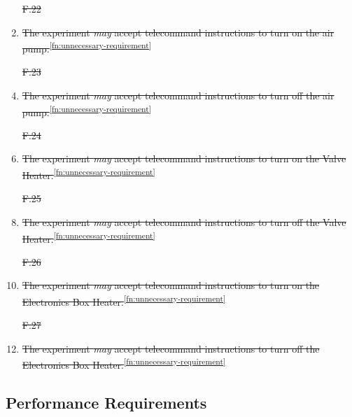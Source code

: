 \documentclass[a4paper,12pt,twoside, final]{article}
\providecommand{\DIFdeltex}[1]{{\protect\color{red}\sout{#1}}}                      %
\providecommand{\DIFaddbegin}{} %
\providecommand{\DIFaddend}{} %
\providecommand{\DIFdelbegin}{} %
\providecommand{\DIFdelend}{} %
\providecommand{\DIFdel}[1]{\texorpdfstring{\DIFdeltex{#1}}{}} %
\newcommand{\DIFscaledelfig}{0.5}
\newlength{\DIFdelgraphicswidth} %
\newlength{\DIFdelgraphicsheight} %
\newcommand{\DIFaddincludegraphics}[2][]{{\color{blue}\fbox{\DIFOincludegraphics[#1]{#2}}}} %
\newcommand{\DIFdelincludegraphics}[2][]{%
\sbox{\DIFdelgraphicsbox}{\DIFOincludegraphics[#1]{#2}}%
\settoboxwidth{\DIFdelgraphicswidth}{\DIFdelgraphicsbox} %
\settoboxtotalheight{\DIFdelgraphicsheight}{\DIFdelgraphicsbox} %
\scalebox{\DIFscaledelfig}{%
\parbox[b]{\DIFdelgraphicswidth}{\usebox{\DIFdelgraphicsbox}\\[-\baselineskip] \rule{\DIFdelgraphicswidth}{0em}}\llap{\resizebox{\DIFdelgraphicswidth}{\DIFdelgraphicsheight}{%
\setlength{\unitlength}{\DIFdelgraphicswidth}%
\begin{picture}(1,1)%
\thicklines\linethickness{2pt} %
{\color[rgb]{1,0,0}\put(0,0){\framebox(1,1){}}}%
{\color[rgb]{1,0,0}\put(0,0){\line( 1,1){1}}}%
{\color[rgb]{1,0,0}\put(0,1){\line(1,-1){1}}}%
\end{picture}%
}\hspace*{3pt}}} %
} %
\DeclareRobustCommand{\DIFaddbegin}{\DIFOaddbegin \let\includegraphics\DIFaddincludegraphics} %
\DeclareRobustCommand{\DIFaddend}{\DIFOaddend \let\includegraphics\DIFOincludegraphics} %
\DeclareRobustCommand{\DIFdelbegin}{\DIFOdelbegin \let\includegraphics\DIFdelincludegraphics} %
\DeclareRobustCommand{\DIFdelend}{\DIFOaddend \let\includegraphics\DIFOincludegraphics} %
\begin{document}
\begin{enumerate}[label=F.\arabic*]
    \DIFdelbegin %
\item[\DIFdel{F.22}]%
\DIFdelend \DIFaddbegin \item \DIFaddend \st{The experiment \textit{may} accept telecommand instructions to turn on the air pump.}\textsuperscript{\ref{fn:unnecessary-requirement}}
    \DIFdelbegin %
\item[\DIFdel{F.23}]%
\DIFdelend \DIFaddbegin \item \DIFaddend \st{The experiment \textit{may} accept telecommand instructions to turn off the air pump.}\textsuperscript{\ref{fn:unnecessary-requirement}}
    \DIFdelbegin %
\item[\DIFdel{F.24}]%
\DIFdelend \DIFaddbegin \item \DIFaddend \st{The experiment \textit{may} accept telecommand instructions to turn on the Valve Heater.}\textsuperscript{\ref{fn:unnecessary-requirement}}
    \DIFdelbegin %
\item[\DIFdel{F.25}]%
\DIFdelend \DIFaddbegin \item \DIFaddend \st{The experiment \textit{may} accept telecommand instructions to turn off the Valve Heater.}\textsuperscript{\ref{fn:unnecessary-requirement}}
    \DIFdelbegin %
\item[\DIFdel{F.26}]%
\DIFdelend \DIFaddbegin \item \DIFaddend \st{The experiment \textit{may} accept telecommand instructions to turn on the Electronics Box Heater.}\textsuperscript{\ref{fn:unnecessary-requirement}}
    \DIFdelbegin %
\item[\DIFdel{F.27}]%
\DIFdelend \DIFaddbegin \item \DIFaddend \st{The experiment \textit{may} accept telecommand instructions to turn off the Electronics Box Heater.}\textsuperscript{\ref{fn:unnecessary-requirement}}
\end{enumerate}
\pagebreak
\subsection{Performance Requirements}
\end{document}
